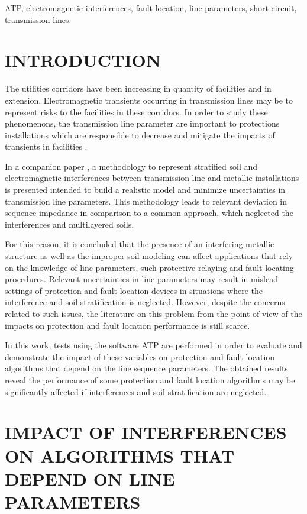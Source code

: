 \documentclass[conference]{IEEEtran}
\begin{document}
\begin{IEEEkeywords}
ATP, electromagnetic interferences, fault location, line parameters, short circuit, transmission lines.
\end{IEEEkeywords}

\section{INTRODUCTION}

The utilities corridors have been increasing in quantity of facilities and in extension. Electromagnetic transients occurring in transmission lines may be to represent risks to the facilities in these corridors. In order to study these phenomenons, the transmission line parameter are important to protections installations which are responsible to decrease and mitigate the impacts of transients in facilities \cite{CIGREWG36}. 

In a companion paper \cite{Moraes2021}, a methodology to represent stratified soil and electromagnetic interferences between transmission line and metallic installations is presented intended to build a realistic model and minimize uncertainties in transmission line parameters. This methodology leads to relevant deviation in sequence impedance in comparison to a common approach, which neglected the interferences and multilayered soils.    

For this reason, it is concluded that the presence of an interfering metallic structure as well as the improper soil modeling can affect applications that rely on the knowledge of line parameters, such protective relaying and fault locating procedures. Relevant uncertainties in line parameters may result in mislead settings of protection and fault location devices in situations where the interference and soil stratification is neglected. However, despite the concerns related to such issues, the literature on this problem from the point of view of the impacts on protection and fault location performance is still scarce. 

In this work, tests using the software ATP are performed in order to evaluate and demonstrate the impact of these variables on protection and fault location algorithms that depend on the line sequence parameters. The obtained results reveal the performance of some protection and fault location algorithms may be significantly affected if interferences and soil stratification are neglected. 


\section{IMPACT OF INTERFERENCES ON ALGORITHMS THAT DEPEND ON LINE PARAMETERS}
\end{document}
